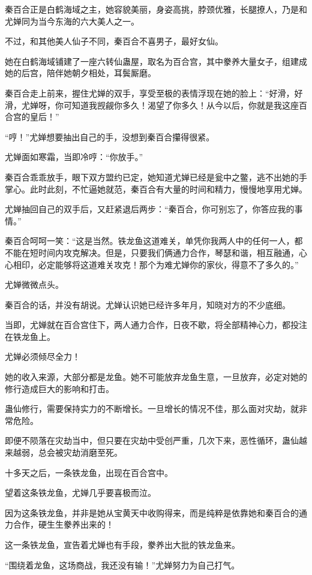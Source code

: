 \begin{this_body}
秦百合正是白鹤海域之主，她容貌美丽，身姿高挑，脖颈优雅，长腿撩人，乃是和尤婵同为当今东海的六大美人之一。

不过，和其他美人仙子不同，秦百合不喜男子，最好女仙。

她在白鹤海域铺建了一座六转仙蛊屋，取名为百合宫，其中豢养大量女子，组建成她的后宫，陪伴她朝夕相处，耳鬓厮磨。

秦百合走上前来，握住尤婵的双手，享受至极的表情浮现在她的脸上：“好滑，好滑，尤婵呀，你可知道我觊觎你多久！渴望了你多久！从今以后，你就是我这座百合宫的皇后！”

“哼！”尤婵想要抽出自己的手，没想到秦百合攥得很紧。

尤婵面如寒霜，当即冷哼：“你放手。”

秦百合乖乖放手，眼下双方盟约已定，她知道尤婵已经是瓮中之鳖，逃不出她的手掌心。此时此刻，不忙逼她就范，秦百合有大量的时间和精力，慢慢地享用尤婵。

尤婵抽回自己的双手后，又赶紧退后两步：“秦百合，你可别忘了，你答应我的事情。”

秦百合呵呵一笑：“这是当然。铁龙鱼这道难关，单凭你我两人中的任何一人，都不能在短时间内攻克解决。但是，只要我们俩通力合作，琴瑟和谐，相互融通，心心相印，必定能够将这道难关攻克！那个为难尤婵你的家伙，得意不了多久的。”

尤婵微微点头。

秦百合的话，并没有胡说。尤婵认识她已经许多年月，知晓对方的不少底细。

当即，尤婵就在百合宫住下，两人通力合作，日夜不歇，将全部精神心力，都投注在铁龙鱼上。

尤婵必须倾尽全力！

她的收入来源，大部分都是龙鱼。她不可能放弃龙鱼生意，一旦放弃，必定对她的修行造成巨大的影响和打击。

蛊仙修行，需要保持实力的不断增长。一旦增长的情况不佳，那么面对灾劫，就非常危险。

即便不陨落在灾劫当中，但只要在灾劫中受创严重，几次下来，恶性循环，蛊仙越来越弱，总会被灾劫消磨至死。

十多天之后，一条铁龙鱼，出现在百合宫中。

望着这条铁龙鱼，尤婵几乎要喜极而泣。

因为这条铁龙鱼，并非是她从宝黄天中收购得来，而是纯粹是依靠她和秦百合的通力合作，硬生生豢养出来的！

这一条铁龙鱼，宣告着尤婵也有手段，豢养出大批的铁龙鱼来。

“围绕着龙鱼，这场商战，我还没有输！”尤婵努力为自己打气。


\end{this_body}
